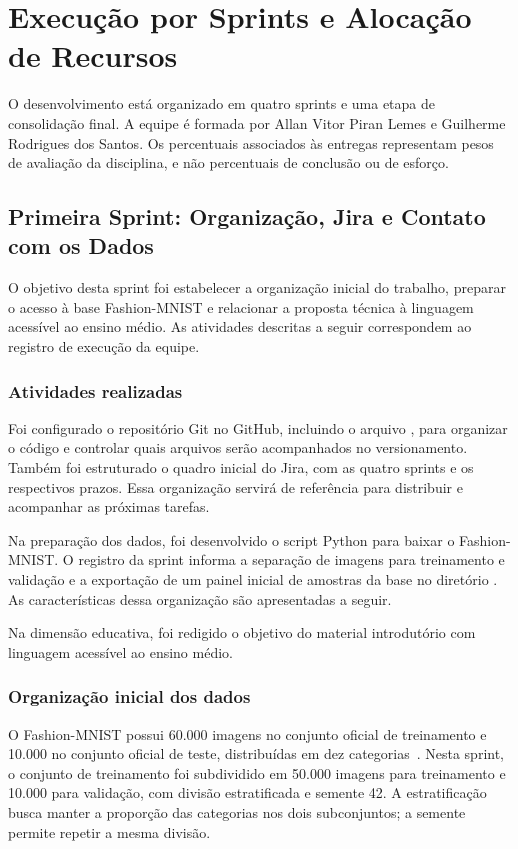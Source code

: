 \documentclass[12pt,a4paper]{article}
\begin{document}
\section{Execução por Sprints e Alocação de Recursos}
O desenvolvimento está organizado em quatro sprints e uma etapa de consolidação final. A equipe é formada por Allan Vitor Piran Lemes e Guilherme Rodrigues dos Santos. Os percentuais associados às entregas representam pesos de avaliação da disciplina, e não percentuais de conclusão ou de esforço.

\subsection{Primeira Sprint: Organização, Jira e Contato com os Dados}

O objetivo desta sprint foi estabelecer a organização inicial do trabalho, preparar o acesso à base Fashion-MNIST e relacionar a proposta técnica à linguagem acessível ao ensino médio. As atividades descritas a seguir correspondem ao registro de execução da equipe.

\subsubsection{Atividades realizadas}
Foi configurado o repositório Git no GitHub, incluindo o arquivo , para organizar o código e controlar quais arquivos serão acompanhados no versionamento. Também foi estruturado o quadro inicial do Jira, com as quatro sprints e os respectivos prazos. Essa organização servirá de referência para distribuir e acompanhar as próximas tarefas.

Na preparação dos dados, foi desenvolvido o script Python  para baixar o Fashion-MNIST. O registro da sprint informa a separação de imagens para treinamento e validação e a exportação de um painel inicial de amostras da base no diretório . As características dessa organização são apresentadas a seguir.

Na dimensão educativa, foi redigido o objetivo do material introdutório com linguagem acessível ao ensino médio.

\subsubsection{Organização inicial dos dados}
\label{sec:dados}
O Fashion-MNIST possui 60.000 imagens no conjunto oficial de treinamento e 10.000 no conjunto oficial de teste, distribuídas em dez categorias~\cite{fashionmnist}. Nesta sprint, o conjunto de treinamento foi subdividido em 50.000 imagens para treinamento e 10.000 para validação, com divisão estratificada e semente 42. A estratificação busca manter a proporção das categorias nos dois subconjuntos; a semente permite repetir a mesma divisão.
\end{document}
